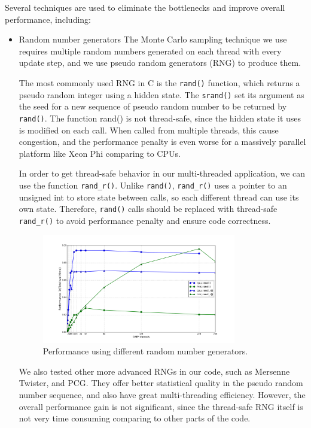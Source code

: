 Several techniques are used to eliminate the bottlenecks and improve overall
performance, including:
\begin{itemize}
\item Random number generators
    The Monte Carlo sampling technique we use requires multiple random numbers 
generated on each thread with every update step, and we use pseudo random generators (RNG)
to produce them. 

  The most commonly used RNG in C is the \texttt{rand()} function, which 
returns a pseudo random integer using a hidden state. The \texttt{srand()} set 
its argument as the seed for a new sequence of pseudo random number to be returned
by \texttt{rand()}. The function rand() is not thread-safe, since the hidden 
state it uses is modified on each call. When called from multiple threads,
this cause congestion, and the performance penalty is even worse for a massively 
parallel platform like Xeon Phi comparing to CPUs.

In order to get thread-safe behavior in
our multi-threaded application, we can use the function \texttt{rand\_r()}. Unlike
\texttt{rand()}, \texttt{rand\_r()} uses a pointer to an unsigned int to store state
between calls, so each different thread can use its own state. 
Therefore, \texttt{rand()} calls should be replaced with thread-safe \texttt{rand\_r()}
to avoid performance penalty and ensure code correctness.

\begin{figure}
  \centering
  \includegraphics[width=0.8\textwidth] {img/mic/perf_rand_r.png}
  \caption{Performance using different random number generators.}
\end{figure}

  We also tested other more advanced RNGs in our code, such as Mersenne Twister, 
and PCG. They offer better statistical quality in the pseudo random number sequence,
and also have great multi-threading efficiency. However, the overall performance
gain is not significant, since the thread-safe RNG itself is not very time consuming
comparing to other parts of the code. 


\end{itemize}
